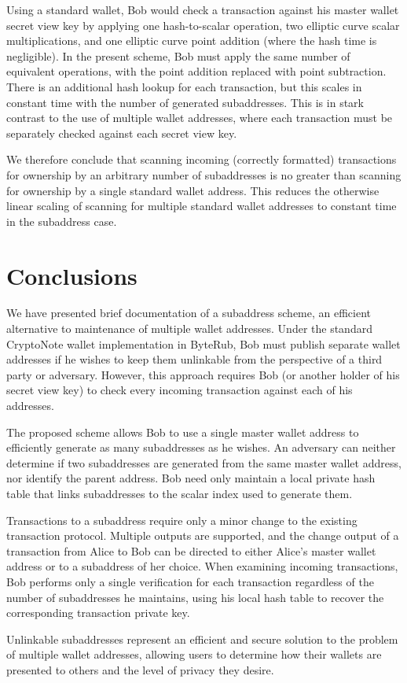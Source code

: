 \documentclass{mrl}
\begin{document}
Using a standard wallet, Bob would check a transaction against his master wallet secret view key by applying one hash-to-scalar operation, two elliptic curve scalar multiplications, and one elliptic curve point addition (where the hash time is negligible). In the present scheme, Bob must apply the same number of equivalent operations, with the point addition replaced with point subtraction. There is an additional hash lookup for each transaction, but this scales in constant time with the number of generated subaddresses. This is in stark contrast to the use of multiple wallet addresses, where each transaction must be separately checked against each secret view key.

We therefore conclude that scanning incoming (correctly formatted) transactions for ownership by an arbitrary number of subaddresses is no greater than scanning for ownership by a single standard wallet address. This reduces the otherwise linear scaling of scanning for multiple standard wallet addresses to constant time in the subaddress case.


\section{Conclusions}
We have presented brief documentation of a subaddress scheme, an efficient alternative to maintenance of multiple wallet addresses. Under the standard CryptoNote wallet implementation in ByteRub, Bob must publish separate wallet addresses if he wishes to keep them unlinkable from the perspective of a third party or adversary. However, this approach requires Bob (or another holder of his secret view key) to check every incoming transaction against each of his addresses.

The proposed scheme allows Bob to use a single master wallet address to efficiently generate as many subaddresses as he wishes. An adversary can neither determine if two subaddresses are generated from the same master wallet address, nor identify the parent address. Bob need only maintain a local private hash table that links subaddresses to the scalar index used to generate them.

Transactions to a subaddress require only a minor change to the existing transaction protocol. Multiple outputs are supported, and the change output of a transaction from Alice to Bob can be directed to either Alice's master wallet address or to a subaddress of her choice. When examining incoming transactions, Bob performs only a single verification for each transaction regardless of the number of subaddresses he maintains, using his local hash table to recover the corresponding transaction private key.

Unlinkable subaddresses represent an efficient and secure solution to the problem of multiple wallet addresses, allowing users to determine how their wallets are presented to others and the level of privacy they desire.



\end{document}
